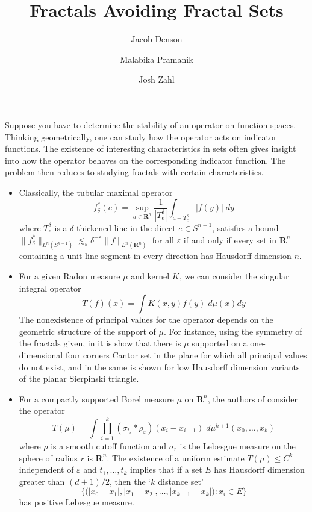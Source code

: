\documentclass{article}
\title{Fractals Avoiding Fractal Sets}
\author{Jacob Denson\\ \and Malabika Pramanik\\ \and Josh Zahl}
\theoremstyle{plain}
\theoremstyle{plain}
\begin{document}
\maketitle

\begin{multicols}{2}

\begin{abstract}
	\blindtext[1]
\end{abstract}

Suppose you have to determine the stability of an operator on function spaces. Thinking geometrically, one can study how the operator acts on indicator functions. The existence of interesting characteristics in sets often gives insight into how the operator behaves on the corresponding indicator function. The problem then reduces to studying fractals with certain characteristics.
%
\begin{itemize}
	\item Classically, the tubular maximal operator
	\[ f_\delta^*(e) = \sup_{a \in \mathbf{R}^n} \frac{1}{|T_e^\delta|} \int_{a + T_e^\delta} |f(y)|\; dy \]
	where $T_e^\delta$ is a $\delta$ thickened line in the direct $e \in S^{n-1}$, satisfies a bound $\| f^*_\delta \|_{L^n(S^{n-1})} \lesssim_\varepsilon \delta^{-\varepsilon} \| f \|_{L^n(\mathbf{R}^n)}$ for all $\varepsilon$ if and only if every set in $\mathbf{R}^n$ containing a unit line segment in every direction has Hausdorff dimension $n$.

	\item For a given Radon measure $\mu$ and kernel $K$, we can consider the singular integral operator
	\[ T(f)(x) = \int K(x,y) f(y)\; d\mu(x) dy \]
	The nonexistence of principal values for the operator depends on the geometric structure of the support of $\mu$. For instance, using the symmetry of the fractals given, in \cite{David} it is show that there is $\mu$ supported on a one-dimensional four corners Cantor set in the plane for which all principal values do not exist, and in \cite{Vasilis} the same is shown for low Hausdorff dimension variants of the planar Sierpinski triangle.

	\item For a compactly supported Borel measure $\mu$ on $\mathbf{R}^n$, the authors of \cite{Bennett} consider the operator
	\[ T(\mu) = \int \prod_{i = 1}^k (\sigma_{t_i} * \rho_\varepsilon)(x_i - x_{i-1})\;  d\mu^{k+1}(x_0, \dots, x_k) \]
	where $\rho$ is a smooth cutoff function and $\sigma_r$ is the Lebesgue measure on the sphere of radius $r$ is $\mathbf{R}^n$. The existence of a uniform estimate $T(\mu) \leq C^k$ independent of $\varepsilon$ and $t_1, \dots, t_k$ implies that if a set $E$ has Hausdorff dimension greater than $(d+1)/2$, then the `$k$ distance set'
	\[ \Big\{ \big(|x_0 - x_1|, |x_1 - x_2|, \dots, |x_{k-1} - x_k|\big) : x_i \in E \Big\} \]
	has positive Lebesgue measure.
\end{itemize}


\end{multicols}
\end{document}
